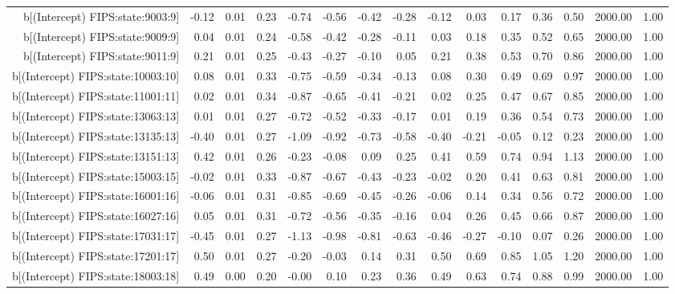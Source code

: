 \begin{table}[ht]
\begin{tabular}{rrrrrrrrrrrrrrr}
  b[(Intercept) FIPS:state:9003:9] & -0.12 & 0.01 & 0.23 & -0.74 & -0.56 & -0.42 & -0.28 & -0.12 & 0.03 & 0.17 & 0.36 & 0.50 & 2000.00 & 1.00 \\ 
  b[(Intercept) FIPS:state:9009:9] & 0.04 & 0.01 & 0.24 & -0.58 & -0.42 & -0.28 & -0.11 & 0.03 & 0.18 & 0.35 & 0.52 & 0.65 & 2000.00 & 1.00 \\ 
  b[(Intercept) FIPS:state:9011:9] & 0.21 & 0.01 & 0.25 & -0.43 & -0.27 & -0.10 & 0.05 & 0.21 & 0.38 & 0.53 & 0.70 & 0.86 & 2000.00 & 1.00 \\ 
  b[(Intercept) FIPS:state:10003:10] & 0.08 & 0.01 & 0.33 & -0.75 & -0.59 & -0.34 & -0.13 & 0.08 & 0.30 & 0.49 & 0.69 & 0.97 & 2000.00 & 1.00 \\ 
  b[(Intercept) FIPS:state:11001:11] & 0.02 & 0.01 & 0.34 & -0.87 & -0.65 & -0.41 & -0.21 & 0.02 & 0.25 & 0.47 & 0.67 & 0.85 & 2000.00 & 1.00 \\ 
  b[(Intercept) FIPS:state:13063:13] & 0.01 & 0.01 & 0.27 & -0.72 & -0.52 & -0.33 & -0.17 & 0.01 & 0.19 & 0.36 & 0.54 & 0.73 & 2000.00 & 1.00 \\ 
  b[(Intercept) FIPS:state:13135:13] & -0.40 & 0.01 & 0.27 & -1.09 & -0.92 & -0.73 & -0.58 & -0.40 & -0.21 & -0.05 & 0.12 & 0.23 & 2000.00 & 1.00 \\ 
  b[(Intercept) FIPS:state:13151:13] & 0.42 & 0.01 & 0.26 & -0.23 & -0.08 & 0.09 & 0.25 & 0.41 & 0.59 & 0.74 & 0.94 & 1.13 & 2000.00 & 1.00 \\ 
  b[(Intercept) FIPS:state:15003:15] & -0.02 & 0.01 & 0.33 & -0.87 & -0.67 & -0.43 & -0.23 & -0.02 & 0.20 & 0.41 & 0.63 & 0.81 & 2000.00 & 1.00 \\ 
  b[(Intercept) FIPS:state:16001:16] & -0.06 & 0.01 & 0.31 & -0.85 & -0.69 & -0.45 & -0.26 & -0.06 & 0.14 & 0.34 & 0.56 & 0.72 & 2000.00 & 1.00 \\ 
  b[(Intercept) FIPS:state:16027:16] & 0.05 & 0.01 & 0.31 & -0.72 & -0.56 & -0.35 & -0.16 & 0.04 & 0.26 & 0.45 & 0.66 & 0.87 & 2000.00 & 1.00 \\ 
  b[(Intercept) FIPS:state:17031:17] & -0.45 & 0.01 & 0.27 & -1.13 & -0.98 & -0.81 & -0.63 & -0.46 & -0.27 & -0.10 & 0.07 & 0.26 & 2000.00 & 1.00 \\ 
  b[(Intercept) FIPS:state:17201:17] & 0.50 & 0.01 & 0.27 & -0.20 & -0.03 & 0.14 & 0.31 & 0.50 & 0.69 & 0.85 & 1.05 & 1.20 & 2000.00 & 1.00 \\ 
  b[(Intercept) FIPS:state:18003:18] & 0.49 & 0.00 & 0.20 & -0.00 & 0.10 & 0.23 & 0.36 & 0.49 & 0.63 & 0.74 & 0.88 & 0.99 & 2000.00 & 1.00 \\ 

\end{tabular}
\end{table}
